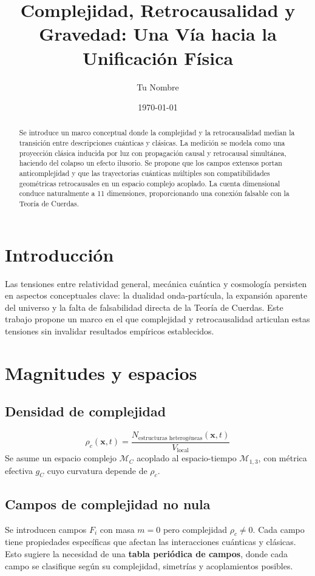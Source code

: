 \documentclass[reprint,amsmath,amssymb,aps]{revtex4-2}
\begin{document}
\title{Complejidad, Retrocausalidad y Gravedad: Una Vía hacia la Unificación Física}
\author{Tu Nombre}
\date{\today}

\begin{abstract}
Se introduce un marco conceptual donde la complejidad y la retrocausalidad median la transición entre descripciones cuánticas y clásicas. La medición se modela como una proyección clásica inducida por luz con propagación causal y retrocausal simultánea, haciendo del colapso un efecto ilusorio. Se propone que los campos extensos portan anticomplejidad y que las trayectorias cuánticas múltiples son compatibilidades geométricas retrocausales en un espacio complejo acoplado. La cuenta dimensional conduce naturalmente a 11 dimensiones, proporcionando una conexión falsable con la Teoría de Cuerdas.
\end{abstract}

\maketitle

\section{Introducción}
Las tensiones entre relatividad general, mecánica cuántica y cosmología persisten en aspectos conceptuales clave: la dualidad onda-partícula, la expansión aparente del universo y la falta de falsabilidad directa de la Teoría de Cuerdas. Este trabajo propone un marco en el que complejidad y retrocausalidad articulan estas tensiones sin invalidar resultados empíricos establecidos.

\section{Magnitudes y espacios}
\subsection{Densidad de complejidad}
\begin{equation}
\rho_c(\mathbf{x},t) = \frac{N_{\text{estructuras heterogéneas}}(\mathbf{x},t)}{V_{\text{local}}}
\end{equation}
Se asume un espacio complejo $\mathcal{M}_C$ acoplado al espacio-tiempo $\mathcal{M}_{1,3}$, con métrica efectiva $g_C$ cuyo curvatura depende de $\rho_c$.

\subsection{Campos de complejidad no nula}
Se introducen campos $F_i$ con masa $m=0$ pero complejidad $\rho_c \neq 0$. Cada campo tiene propiedades específicas que afectan las interacciones cuánticas y clásicas. Esto sugiere la necesidad de una \textbf{tabla periódica de campos}, donde cada campo se clasifique según su complejidad, simetrías y acoplamientos posibles.
\end{document}

